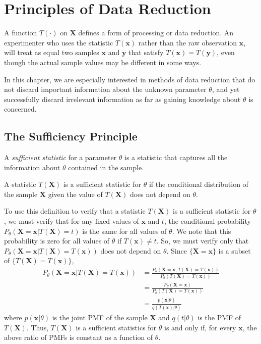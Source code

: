 \chapter{Principles of Data Reduction}

A function $T(\cdot)$ on $\mathbf{X}$ defines a form of processing or data reduction.
An experimenter who uses the statistic $T(\mathbf{x})$ rather than the raw observation $\mathbf{x}$, will treat as equal two samples $\mathbf{x}$ and $\mathbf{y}$ that satisfy $T(\mathbf{x}) = T(\mathbf{y})$, even though the actual sample values may be different in some ways.


In this chapter, we are especially interested in methods of data reduction that do not discard important information about the unknown parameter $\theta$, and yet successfully discard irrelevant information as far as gaining knowledge about $\theta$ is concerned.


\section{The Sufficiency Principle}


 A \emph{sufficient statistic} for a parameter $\theta$ is a statistic that captures all the information about $\theta$ contained in the sample.

\begin{definition}
A statistic $T(\mathbf{X})$ is a sufficient statistic for $\theta$ if the conditional distribution of the sample $\mathbf{X}$ given the value of $T(\mathbf{X})$ does not depend on $\theta$.
\end{definition}

To use this definition to verify that a statistic $T(\mathbf{X})$ is a sufficient statistic for $\theta$, we must verify that for any fixed values of $\mathbf{x}$ and $t$, the conditional probability $P_{\theta} (\mathbf{X} = \mathbf{x} | T (\mathbf{X}) = t)$ is the same for all values of $\theta$.
We note that this probability is zero for all values of $\theta$ if $T(\mathbf{x}) \neq t$.
So, we must verify only that $P_{\theta} (\mathbf{X} = \mathbf{x} | T (\mathbf{X}) = T(\mathbf{x}))$ does not depend on $\theta$.
Since $\{ \mathbf{X} = \mathbf{x} \}$ is a subset of $\{ T(\mathbf{X}) = T(\mathbf{x}) \}$,
\begin{equation*}
\begin{split}
P_{\theta} (\mathbf{X} = \mathbf{x} | T (\mathbf{X}) = T(\mathbf{x}))
&= \frac{ P_{\theta} (\mathbf{X} = \mathbf{x}, T (\mathbf{X}) = T(\mathbf{x})) }{ P_{\theta} (T (\mathbf{X}) = T(\mathbf{x})) } \\
&= \frac{ P_{\theta} (\mathbf{X} = \mathbf{x}) }{ P_{\theta} (T (\mathbf{X}) = T(\mathbf{x})) } \\
&= \frac{ p (\mathbf{x} | \theta) }{ q(T (\mathbf{x}) | \theta) }
\end{split}
\end{equation*}
where $p(\mathbf{x}|\theta)$ is the joint PMF of the sample $\mathbf{X}$ and $q(t|\theta)$ is the PMF of $T(\mathbf{X})$.
Thus, $T(\mathbf{X})$ is a sufficient statistics for $\theta$ is and only if, for every $\mathbf{x}$, the above ratio of PMFs is constant as a function of $\theta$.

